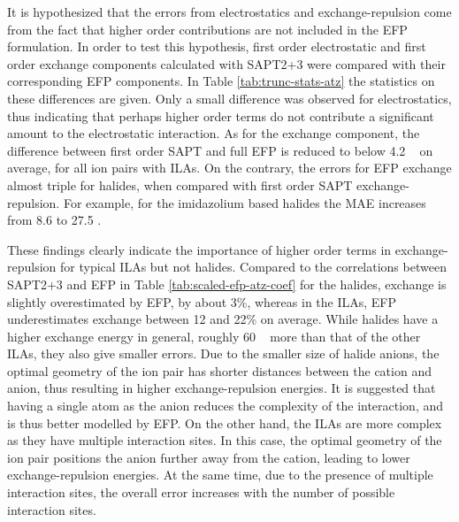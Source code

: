 It is hypothesized that the errors from electrostatics and exchange-repulsion come from the fact that higher order contributions are not included in the EFP formulation.
In order to test this hypothesis, first order electrostatic and first order exchange components calculated with SAPT2+3 were compared with their corresponding EFP components. 
In Table \ref{tab:trunc-stats-atz} the statistics on these differences are given.
Only a small difference was observed for electrostatics, thus indicating that perhaps higher order terms do not contribute a significant amount to the electrostatic interaction.
As for the exchange component, the difference between first order SAPT and full EFP is reduced to below 4.2 \enUnit~ on average, for all ion pairs with ILAs.
On the contrary, the errors for EFP exchange almost triple for halides, when compared with first order SAPT exchange-repulsion.
For example, for the imidazolium based halides the MAE increases from 8.6 to 27.5 \enUnit.


These findings clearly indicate the importance of higher order terms in exchange-repulsion for typical ILAs but not halides.
Compared to the correlations between SAPT2+3 and EFP in Table \ref{tab:scaled-efp-atz-coef} for the halides, exchange is slightly overestimated by EFP, by about 3\%, whereas in the ILAs, EFP underestimates exchange between 12 and 22\% on average. 
While halides have a higher exchange energy in general, roughly 60 \enUnit~ more than that of the other ILAs, they also give smaller errors. 
Due to the smaller size of halide anions, the optimal geometry of the ion pair has shorter distances between the cation and anion, thus resulting in higher exchange-repulsion energies.
It is suggested that having a single atom as the anion reduces the complexity of the interaction, and is thus better modelled by EFP.
On the other hand, the ILAs are more complex as they have multiple interaction sites.
In this case, the optimal geometry of the ion pair positions the anion further away from the cation, leading to lower exchange-repulsion energies.
At the same time, due to the presence of multiple interaction sites, the overall error increases with the number of possible interaction sites.


